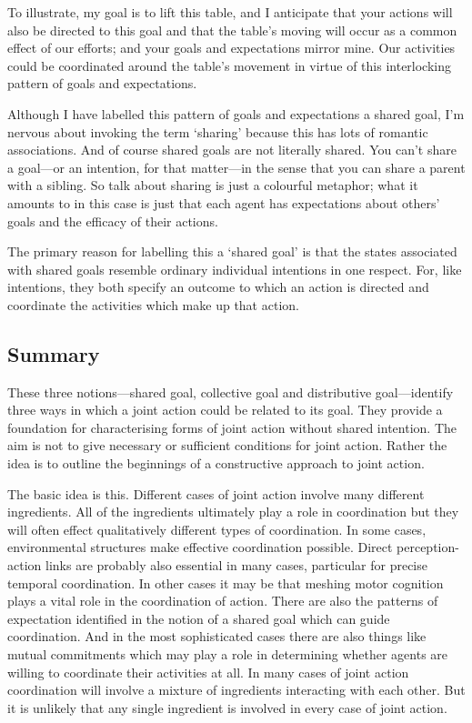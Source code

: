 \documentclass[14pt,a4paper]{extarticle}
\begin{document}
To illustrate, my goal is to lift this table, and I anticipate that your actions will also be directed to this goal and that the table's moving will occur as a common effect of our efforts; and your goals and expectations mirror mine.
Our activities could be coordinated around the table's movement in virtue of this interlocking pattern of goals and expectations. 

Although I have labelled this pattern of goals and expectations a shared goal, I'm nervous about invoking the term `sharing' because this has lots of romantic associations.  And of course shared goals are not literally shared.  You can't share a goal---or an intention, for that matter---in the sense that you can share a parent with a sibling.  So talk about sharing is just a colourful metaphor; what it amounts to in this case is just that each agent has expectations about others' goals and the efficacy of their actions.

The primary reason for labelling this a `shared goal' is that the states associated with shared goals resemble ordinary individual intentions in one respect.  For, like intentions, they both specify an outcome to which an action is directed and coordinate the activities which make up that action.  


\subsection{Summary}
These three notions---shared goal, collective goal and distributive goal---identify three ways in which a joint action could be related to its goal.
They provide a foundation for characterising forms of joint action without shared intention.
The aim is not to give necessary or sufficient conditions for joint action.
Rather the idea is to outline the beginnings of a constructive approach to joint action.

The basic idea is this.
Different cases of joint action involve many different ingredients.
All of the ingredients ultimately play a role in coordination but they will often effect qualitatively different types of coordination.
In some cases, environmental structures make effective coordination possible.
Direct perception-action links are probably also essential in many cases, particular for precise temporal coordination.
In other cases it may be that meshing motor cognition plays a vital role in the coordination of action.
There are also the patterns of expectation identified in the notion of a shared goal which can guide coordination.
And in the most sophisticated cases there are also things like mutual commitments which may play a role in determining whether agents are willing to coordinate their activities at all.
In many cases of joint action coordination will involve a mixture of ingredients interacting with each other.
But it is unlikely that any single ingredient is involved in every case of joint action.
\end{document}
